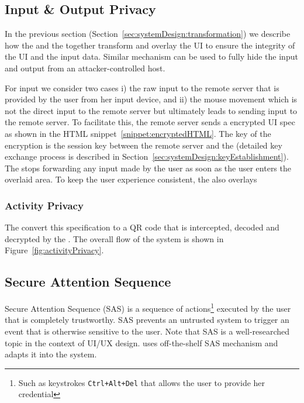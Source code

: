 \subsection{Input \& Output Privacy}
\label{sec:systemDesign:mousePrivacy}


In the previous section (Section~\ref{sec:systemDesign:transformation}) we describe how the \name \js and the \device together transform and overlay the UI to ensure the integrity of the UI and the input data. Similar mechanism can be used to fully hide the input and output from an attacker-controlled host. 

For input we consider two cases i) the raw input to the remote server that is provided by the user from her input device, and ii) the mouse movement which is not the direct input to the remote server but ultimately leads to sending input to the remote server. To facilitate this, the remote server sends a encrypted UI spec as shown in the HTML snippet~\ref{snippet:encryptedHTML}. The key of the encryption is the session \tls key between the remote server and the \device (detailed key exchange process is described in Section~\ref{sec:systemDesign:keyEstablishment}). The \device stops forwarding any input made by the user as soon as the user enters the overlaid area. To keep the user experience consistent, the \device also overlays  

\subsubsection{Activity Privacy}

The \name \js convert this specification to a QR code that is intercepted, decoded and decrypted by the \device. The overall flow of the system is shown in Figure~\ref{fig:activityPrivacy}.  


\subsection{Secure Attention Sequence}
\label{sec:systemDesign:SAS}

Secure Attention Sequence (SAS) is a sequence of actions\footnote{Such as keystrokes \texttt{Ctrl+Alt+Del} that allows the user to provide her credential} executed by the user that is completely trustworthy. SAS prevents an untrusted system to trigger an event that is otherwise sensitive to the user. Note that SAS is a well-researched topic in the context of UI/UX design. \name uses off-the-shelf SAS mechanism and adapts it into the system. 

